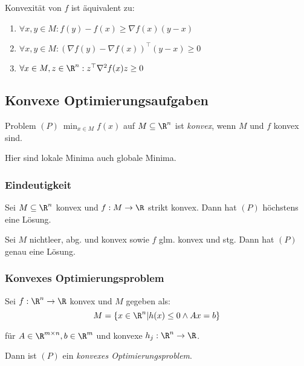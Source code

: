 Konvexität von \(f\) ist äquivalent zu:

\begin{enumerate}[label=(\alph*)]
\item \(\forall x, y \in M : f(y)-f(x) \geq \nabla f(x)(y-x)\)
\item \(\forall x, y \in M : (\nabla f(y) - \nabla f(x))^\top (y-x) \geq 0\)
\item \(\forall x \in M, z \in \R^n : z^\top \nabla^2 f(x)z \geq 0\)
\end{enumerate}

\subsection*{Konvexe Optimierungsaufgaben}

Problem \((P) \ \min_{x \in M} f(x)\) auf \(M \subseteq \R^n\) ist \emph{konvex}, wenn \(M\) und \(f\) konvex sind.

\spacing

Hier sind lokale Minima auch globale Minima.

\subsubsection*{Eindeutigkeit}

Sei \(M \subseteq \R^n\) konvex und \(f : M \to \R\) strikt konvex. Dann hat \((P)\) höchstens eine Lösung.

\spacing

Sei \(M\) nichtleer, abg. und konvex sowie \(f\) glm. konvex und stg. Dann hat \((P)\) genau eine Lösung.

\subsubsection*{Konvexes Optimierungsproblem}

Sei \(f : \R^n \to \R\) konvex und \(M\) gegeben als: \[M = \{x \in \R^n | h(x) \leq 0 \land Ax=b\}\]

für \(A \in \R^{m \times n}, b \in \R^m\) und konvexe \(h_j : \R^n \to \R\).

Dann ist \((P)\) ein \emph{konvexes Optimierungsproblem}.
